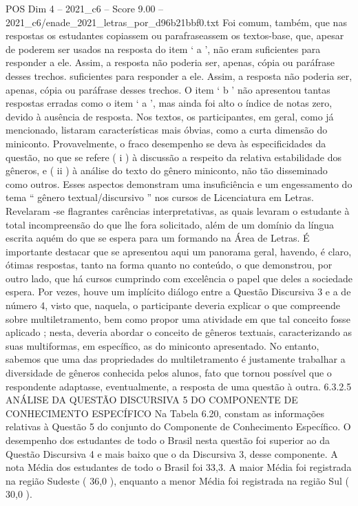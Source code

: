 \begin{textsample}{POS Dim 4 – 2021\_c6 – Score 9.00 – 2021\_c6/enade\_2021\_letras\_por\_d96b21bbf0.txt}
Foi comum, também, que nas respostas os estudantes copiassem ou parafraseassem os textos-base, que, apesar de poderem ser usados na resposta do item ‘ a ’, não eram suficientes para responder a ele.
Assim, a resposta não poderia ser, apenas, cópia ou paráfrase desses trechos. suficientes para responder a ele.
Assim, a resposta não poderia ser, apenas, cópia ou paráfrase desses trechos.
O item ‘ b ’ não apresentou tantas respostas erradas como o item ‘ a ’, mas ainda foi alto o índice de notas zero, devido à ausência de resposta.
Nos textos, os participantes, em geral, como já mencionado, listaram características mais óbvias, como a curta dimensão do miniconto.
Provavelmente, o fraco desempenho se deva às especificidades da questão, no que se refere ( i ) à discussão a respeito da relativa estabilidade dos gêneros, e ( ii ) à análise do texto do gênero miniconto, não tão disseminado como outros.
Esses aspectos demonstram uma insuficiência e um engessamento do tema “ gênero textual/discursivo ” nos cursos de Licenciatura em Letras.
Revelaram -se flagrantes carências interpretativas, as quais levaram o estudante à total incompreensão do que lhe fora solicitado, além de um domínio da língua escrita aquém do que se espera para um formando na Área de Letras.
É importante destacar que se apresentou aqui um panorama geral, havendo, é claro, ótimas respostas, tanto na forma quanto no conteúdo, o que demonstrou, por outro lado, que há cursos cumprindo com excelência o papel que deles a sociedade espera.
Por vezes, houve um implícito diálogo entre a Questão Discursiva 3 e a de número 4, visto que, naquela, o participante deveria explicar o que compreende sobre multiletramento, bem como propor uma atividade em que tal conceito fosse aplicado ; nesta, deveria abordar o conceito de gêneros textuais, caracterizando as suas multiformas, em específico, as do miniconto apresentado.
No entanto, sabemos que uma das propriedades do multiletramento é justamente trabalhar a diversidade de gêneros conhecida pelos alunos, fato que tornou possível que o respondente adaptasse, eventualmente, a resposta de uma questão à outra. 6.3.2.5 ANÁLISE DA QUESTÃO DISCURSIVA 5 DO COMPONENTE DE CONHECIMENTO ESPECÍFICO Na Tabela 6.20, constam as informações relativas à Questão 5 do conjunto do Componente de Conhecimento Específico.
O desempenho dos estudantes de todo o Brasil nesta questão foi superior ao da Questão Discursiva 4 e mais baixo que o da Discursiva 3, desse componente.
A nota Média dos estudantes de todo o Brasil foi 33,3.
A maior Média foi registrada na região Sudeste ( 36,0 ), enquanto a menor Média foi registrada na região Sul ( 30,0 ).

\end{textsample}
